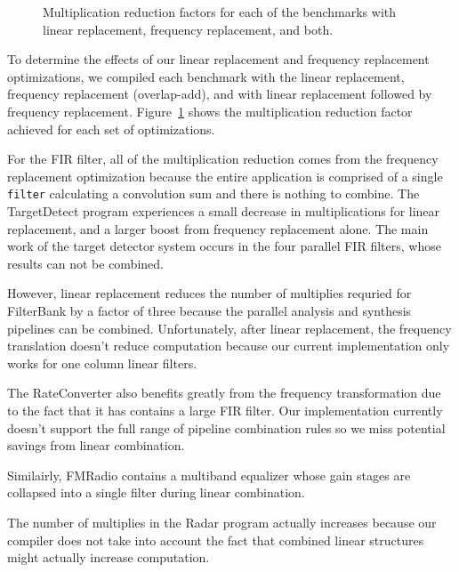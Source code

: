 \begin{figure}
\center
\epsfxsize=3.2in
\vspace{-6pt}
\caption{Multiplication reduction factors for each of the benchmarks with linear replacement, frequency replacement, and both.}
\label{fig:linear-freq-both}
\vspace{-12pt}
\end{figure}

To determine the effects of our linear replacement and frequency replacement 
optimizations, we compiled each benchmark with the linear 
replacement, frequency replacement (overlap-add),
and with linear replacement followed by frequency replacement. 
Figure~\ref{fig:linear-freq-both} shows the multiplication reduction factor 
achieved for each set of optimizations.

For the FIR filter, all of the multiplication reduction comes from the frequency
replacement optimization because the entire application is comprised of a single
{\tt filter} calculating a convolution sum and there is nothing to combine.
The TargetDetect program experiences a small decrease in multiplications 
for linear replacement, and a larger boost from frequency replacement alone.
The main work of the target detector system occurs in the four parallel FIR filters, whose
results can not be combined.

However, linear replacement reduces the number of multiplies 
requried for FilterBank by a factor of three because the parallel analysis and 
synthesis pipelines can be combined. Unfortunately, after
linear replacement, the frequency translation doesn't reduce computation 
because our current implementation only works for one column linear filters.

The RateConverter also benefits greatly from the frequency transformation
due to the fact that it has contains a large FIR filter. Our implementation
currently doesn't support the full range of pipeline combination rules so
we miss potential savings from linear combination.

Similairly, FMRadio contains a multiband equalizer whose gain stages are collapsed
into a single filter during linear combination.

The number of multiplies in the Radar program actually increases because our 
compiler does not take into account the fact that combined linear structures 
might actually increase computation. %


